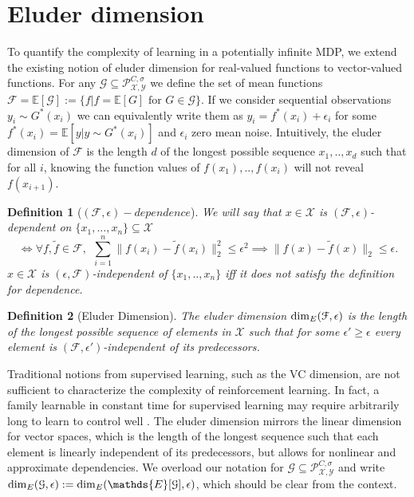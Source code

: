\documentclass{article}
\newtheorem{mydef}{Definition}
\newcommand{\Exp}{\mathds{E}}
\newcommand{\Xc}{\mathcal{X}}
\newcommand{\Yc}{\mathcal{Y}}
\newcommand{\Pc}{\mathcal{P}}
\newcommand{\Fc}{\mathcal{F}}
\newcommand{\Gc}{\mathcal{G}}
\begin{document}
\section{Eluder dimension}
\label{sec: eluder}
To quantify the complexity of learning in a potentially infinite MDP, we extend the existing notion of eluder dimension for real-valued functions \cite{russo2013eluder} to vector-valued functions.
For any $\Gc \subseteq \Pc^{C,\sigma}_{\Xc,\Yc}$ we define the set of mean functions $\Fc = \Exp[\Gc] := \{f | f=\Exp[G] \text{ for } G \in \Gc \}$.
If we consider sequential observations $y_i \sim G^*(x_i)$ we can equivalently write them as $y_i = f^*(x_i) + \epsilon_i$ for some $f^*(x_i) = \Exp[y | y \sim G^*(x_i)]$ and $\epsilon_i$ zero mean noise.
Intuitively, the eluder dimension of $\Fc$ is the length $d$ of the longest possible sequence $x_1,..,x_d$ such that for all $i$, knowing the function values of $f(x_1),..,f(x_i)$ will not reveal $f(x_{i+1})$.

\begin{mydef}[$ (\mathcal{F},\epsilon)-dependence$]
\hspace{0.00000000000001mm} \newline
We will say that $x \in \mathcal{X}$ is $(\Fc,\epsilon)$-dependent on $\{x_1,...,x_n\} \subseteq \Xc $
$$ \iff \forall f,\tilde{f} \in \Fc, \ \ \sum_{i=1}^{n} \| f(x_i) - \tilde{f}(x_i) \|_2^2 \le \epsilon^2 \implies \| f(x) - \tilde{f}(x)\|_2 \le \epsilon.$$
$x \in \mathcal{X}$ is $(\epsilon,\mathcal{F})$-independent of $\{x_1,..,x_n\}$ iff it does not satisfy the definition for dependence.
\end{mydef}

\begin{mydef}[Eluder Dimension]
\label{def: Eluder} \hspace{0.00000000000001mm} \newline
The eluder dimension ${\rm dim}_E(\Fc,\epsilon)$ is the length of the longest possible sequence of elements in $\Xc$ such that for some $\epsilon' \ge \epsilon$ every element is $(\Fc,\epsilon')$-independent of its predecessors.
\end{mydef}

Traditional notions from supervised learning, such as the VC dimension, are not sufficient to characterize the complexity of reinforcement learning.
In fact, a family learnable in constant time for supervised learning may require arbitrarily long to learn to control well \cite{russo2013eluder}.
The eluder dimension mirrors the linear dimension for vector spaces, which is the length of the longest sequence such that each element is linearly independent of its predecessors, but allows for nonlinear and approximate dependencies.
We overload our notation for $\Gc \subseteq \Pc^{C,\sigma}_{\Xc,\Yc}$ and write ${\rm dim}_E(\Gc,\epsilon) := {\rm dim}_E(\Exp[\Gc],\epsilon)$, which should be clear from the context.
\end{document}
